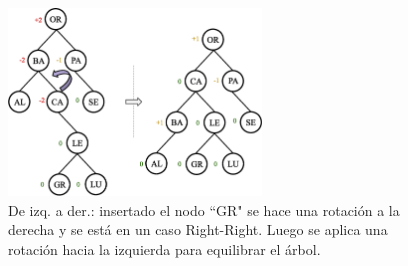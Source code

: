 \begin{figure}[htpb!]
  \begin{center}
    \includegraphics[width=0.6\textwidth]{images/AVLInsertion6.eps}
  \end{center}
  \caption{De izq. a der.: insertado el nodo ``GR" se hace una rotación a la derecha y se está en un caso Right-Right. Luego se aplica una rotación hacia la izquierda para equilibrar el árbol.}
  \label{fig:AVLInsertion6}
\end{figure}
